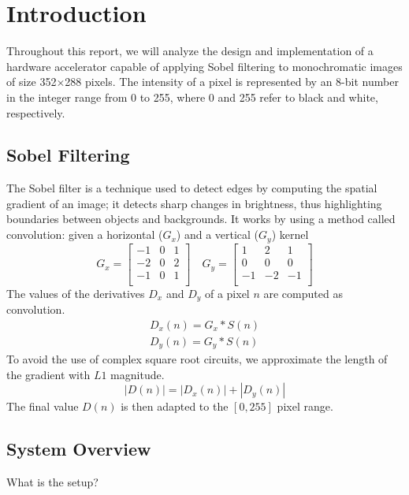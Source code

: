 
\section{Introduction} \label{ch1}

Throughout this report, we will analyze the design and implementation of a hardware accelerator capable of applying Sobel filtering to monochromatic images of size 352$\times$288 pixels. The intensity of a pixel is represented by an 8-bit number in the integer range from 0 to 255, where 0 and 255 refer to black and white, respectively.

\subsection{Sobel Filtering}

The Sobel filter is a technique used to detect edges by computing the spatial gradient of an image; it detects sharp changes in brightness, thus highlighting boundaries between objects and backgrounds. It works by using a method called convolution: given a horizontal ($G_x$) and a vertical ($G_y$) kernel
$$G_x=\begin{bmatrix}
    -1 & 0 & 1 \\
    -2 & 0 & 2 \\
    -1 & 0 & 1 \\
\end{bmatrix}\quad G_y=\begin{bmatrix}
    1 & 2 & 1 \\
    0 & 0 & 0 \\
    -1 & -2 & -1 \\
\end{bmatrix}$$
The values of the derivatives $D_x$ and $D_y$ of a pixel $n$ are computed as convolution.
\begin{align*}
    D_x(n)=G_x * S(n)\\
    D_y(n)=G_y * S(n)
\end{align*}
To avoid the use of complex square root circuits, we approximate the length of the gradient with $L1$ magnitude.
$$|D(n)|=|D_x(n)|+|D_y(n)|$$
The final value $D(n)$ is then adapted to the $[0,255]$ pixel range.

\subsection{System Overview}

What is the setup?